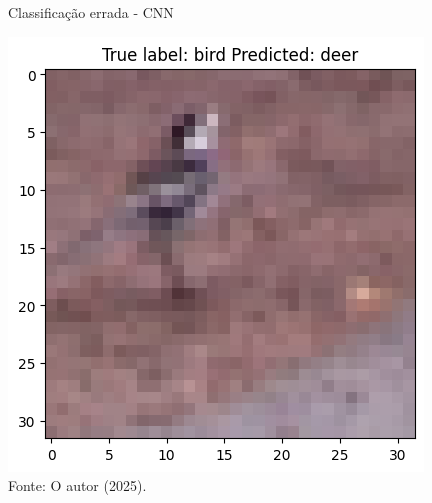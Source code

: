 \begin{figure}[H]
\centering
\caption{Classificação errada - CNN}
\includegraphics[width=.8\linewidth]{apendices/fig/9_IAA009_4.png}
\caption*{Fonte: O autor (2025).}
\end{figure}

